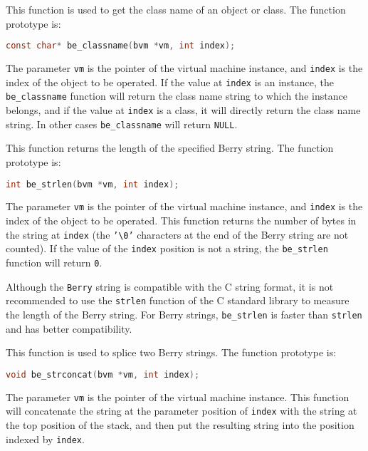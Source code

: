 
This function is used to get the class name of an object or class. The function prototype is:
\begin{lstlisting}[language=c, style=berry, numbers=none]
const char* be_classname(bvm *vm, int index);
\end{lstlisting}
The parameter \texttt{vm} is the pointer of the virtual machine instance, and \texttt{index} is the index of the object to be operated. If the value at \texttt{index} is an instance, the \texttt{be\_classname} function will return the class name string to which the instance belongs, and if the value at \texttt{index} is a class, it will directly return the class name string. In other cases \texttt{be\_classname} will return \texttt{NULL}.


This function returns the length of the specified Berry string. The function prototype is:
\begin{lstlisting}[language=c, style=berry, numbers=none]
int be_strlen(bvm *vm, int index);
\end{lstlisting}
The parameter \texttt{vm} is the pointer of the virtual machine instance, and \texttt{index} is the index of the object to be operated. This function returns the number of bytes in the string at \texttt{index} (the \texttt{'\textbackslash 0'} characters at the end of the Berry string are not counted). If the value of the \texttt{index} position is not a string, the \texttt{be\_strlen} function will return \texttt{0}.

Although the \texttt{Berry} string is compatible with the C string format, it is not recommended to use the \texttt{strlen} function of the C standard library to measure the length of the Berry string. For Berry strings, \texttt{be\_strlen} is faster than \texttt{strlen} and has better compatibility.


This function is used to splice two Berry strings. The function prototype is:
\begin{lstlisting}[language=c, style=berry, numbers=none]
void be_strconcat(bvm *vm, int index);
\end{lstlisting}
The parameter \texttt{vm} is the pointer of the virtual machine instance. This function will concatenate the string at the parameter position of \texttt{index} with the string at the top position of the stack, and then put the resulting string into the position indexed by \texttt{index}.

